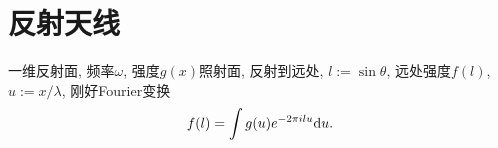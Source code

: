 \chapter{反射天线}

一维反射面, 频率$\omega$, 强度$g(x)$照射面, 反射到远处, $l:=\sin\theta$, 远处强度$f(l)$, $u:=x/\lambda$, 刚好Fourier变换
\begin{equation}
    f(l)=\int g(u)e^{-2\pi ilu}\mathrm{d} u.
\end{equation}
